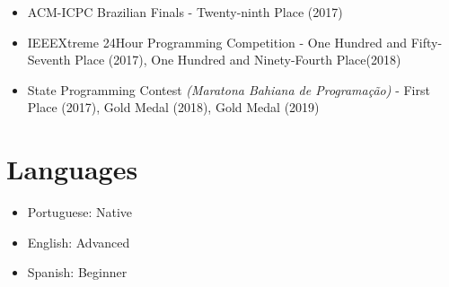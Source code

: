 \documentclass[11pt,a4paper,sans]{moderncv}
\begin{document}
\begin{itemize}
    \item ACM-ICPC Brazilian Finals - Twenty-ninth Place (2017)
    
    \vspace{6pt}
    
    \item IEEEXtreme 24Hour Programming Competition - One Hundred and Fifty-Seventh Place (2017), One Hundred and Ninety-Fourth Place(2018)
    
    \vspace{6pt}
    
    \item State Programming Contest \textit{(Maratona Bahiana de Programação)} - First Place (2017), Gold Medal (2018), Gold Medal (2019)
\end{itemize}

\section{Languages}

\begin{itemize}

\item{Portuguese: Native}
\vspace{6pt}
\item{English: Advanced}
\vspace{6pt}
\item{Spanish: Beginner}

\end{itemize}

\nocite{*}



\end{document}
